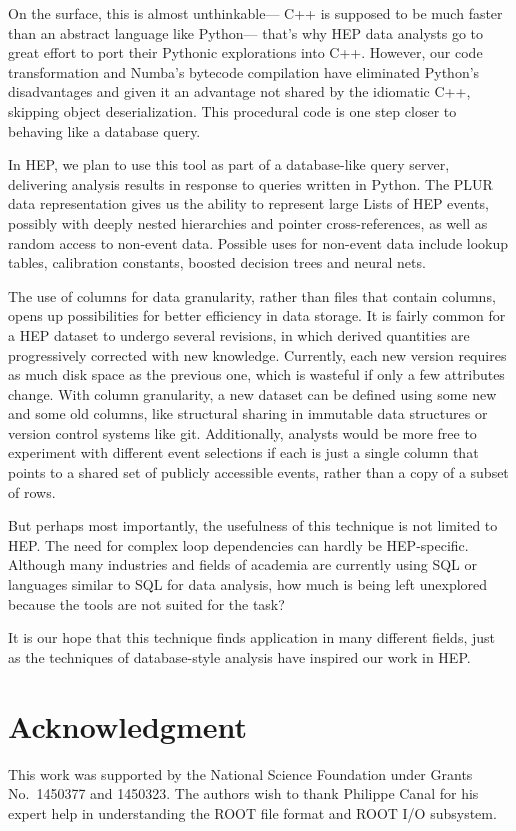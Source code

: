 \documentclass[10pt, conference, compsocconf]{IEEEtran}
\begin{document}
On the surface, this is almost unthinkable--- C++ is supposed to be much faster than an abstract language like Python--- that's why HEP data analysts go to great effort to port their Pythonic explorations into C++. However, our code transformation and Numba's bytecode compilation have eliminated Python's disadvantages and given it an advantage not shared by the idiomatic C++, skipping object deserialization. This procedural code is one step closer to behaving like a database query.

In HEP, we plan to use this tool as part of a database-like query server, delivering analysis results in response to queries written in Python. The PLUR data representation gives us the ability to represent large Lists of HEP events, possibly with deeply nested hierarchies and pointer cross-references, as well as random access to non-event data. Possible uses for non-event data include lookup tables, calibration constants, boosted decision trees and neural nets.

The use of columns for data granularity, rather than files that contain columns, opens up possibilities for better efficiency in data storage. It is fairly common for a HEP dataset to undergo several revisions, in which derived quantities are progressively corrected with new knowledge. Currently, each new version requires as much disk space as the previous one, which is wasteful if only a few attributes change. With column granularity, a new dataset can be defined using some new and some old columns, like structural sharing in immutable data structures or version control systems like git. Additionally, analysts would be more free to experiment with different event selections if each is just a single column that points to a shared set of publicly accessible events, rather than a copy of a subset of rows.

But perhaps most importantly, the usefulness of this technique is not limited to HEP. The need for complex loop dependencies can hardly be HEP-specific. Although many industries and fields of academia are currently using SQL or languages similar to SQL for data analysis, how much is being left unexplored because the tools are not suited for the task?

It is our hope that this technique finds application in many different fields, just as the techniques of database-style analysis have inspired our work in HEP.

\section*{Acknowledgment}

This work was supported by the National Science Foundation under Grants No.\ 1450377 and 1450323. The authors wish to thank Philippe Canal for his expert help in understanding the ROOT file format and ROOT I/O subsystem.



\end{document}
